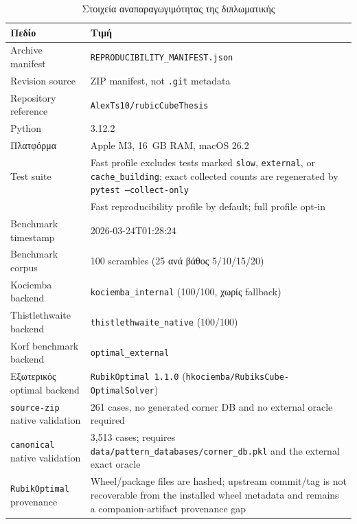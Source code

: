\begin{table}[htbp]
\centering
\caption{Στοιχεία αναπαραγωγιμότητας της διπλωματικής}
\label{tab:reproducibility_snapshot}
\begin{tabularx}{\textwidth}{>{\RaggedRight\arraybackslash}p{4.4cm} Y}
\toprule
\textbf{Πεδίο} & \textbf{Τιμή} \\
\midrule
Archive manifest & \texttt{REPRODUCIBILITY\_MANIFEST.json} \\
Revision source & ZIP manifest, not \texttt{.git} metadata \\
Repository reference & \texttt{AlexTs10/rubicCubeThesis} \\
Python & 3.12.2 \\
Πλατφόρμα & Apple M3, 16~GB RAM, macOS 26.2 \\
Test suite & Fast profile excludes tests marked \texttt{slow}, \texttt{external}, or \texttt{cache\_building}; exact collected counts are regenerated by \texttt{pytest --collect-only} \\
 & Fast reproducibility profile by default; full profile opt-in \\
Benchmark timestamp & 2026-03-24T01:28:24 \\
Benchmark corpus & 100 scrambles (25 ανά βάθος 5/10/15/20) \\
Kociemba backend & \texttt{kociemba\_internal} (100/100, χωρίς fallback) \\
Thistlethwaite backend & \texttt{thistlethwaite\_native} (100/100) \\
Korf benchmark backend & \texttt{optimal\_external} \\
Εξωτερικός optimal backend & \texttt{RubikOptimal 1.1.0} (\texttt{hkociemba/RubiksCube-OptimalSolver}) \\
\texttt{source-zip} native validation & 261 cases, no generated corner DB and no external oracle required \\
\texttt{canonical} native validation & 3,513 cases; requires \texttt{data/pattern\_databases/corner\_db.pkl} and the external exact oracle \\
\texttt{RubikOptimal} provenance & Wheel/package files are hashed; upstream commit/tag is not recoverable from the installed wheel metadata and remains a companion-artifact provenance gap \\
\bottomrule
\end{tabularx}
\end{table}

